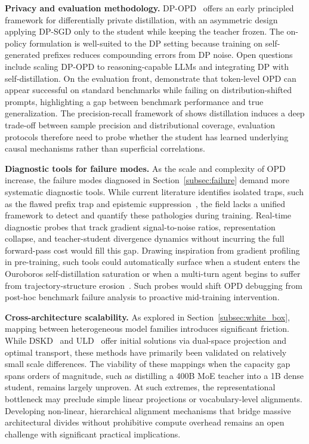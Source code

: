 \documentclass{article} %
\begin{document}
\textbf{Privacy and evaluation methodology.} DP-OPD~\citep{2604.04461} offers an early principled framework for differentially private distillation, with an asymmetric design applying DP-SGD only to the student while keeping the teacher frozen. The on-policy formulation is well-suited to the DP setting because training on self-generated prefixes reduces compounding errors from DP noise. Open questions include scaling DP-OPD to reasoning-capable LLMs and integrating DP with self-distillation. On the evaluation front, \citet{2603.25562} demonstrate that token-level OPD can appear successful on standard benchmarks while failing on distribution-shifted prompts, highlighting a gap between benchmark performance and true generalization. The precision-recall framework of \citet{2505.13111} shows distillation induces a deep trade-off between sample precision and distributional coverage, evaluation protocols therefore need to probe whether the student has learned underlying causal mechanisms rather than superficial correlations.

\textbf{Diagnostic tools for failure modes.} As the scale and complexity of OPD increase, the failure modes diagnosed in Section~\ref{subsec:failure} demand more systematic diagnostic tools. While current literature identifies isolated traps, such as the flawed prefix trap and epistemic suppression~\citep{2603.24472}, the field lacks a unified framework to detect and quantify these pathologies during training. Real-time diagnostic probes that track gradient signal-to-noise ratios, representation collapse, and teacher-student divergence dynamics without incurring the full forward-pass cost would fill this gap. Drawing inspiration from gradient profiling in pre-training, such tools could automatically surface when a student enters the Ouroboros self-distillation saturation or when a multi-turn agent begins to suffer from trajectory-structure erosion~\citep{2605.02943}. Such probes would shift OPD debugging from post-hoc benchmark failure analysis to proactive mid-training intervention.

\textbf{Cross-architecture scalability.} As explored in Section~\ref{subsec:white_box}, mapping between heterogeneous model families introduces significant friction. While DSKD~\citep{2504.11426} and ULD~\citep{2402.12030} offer initial solutions via dual-space projection and optimal transport, these methods have primarily been validated on relatively small scale differences. The viability of these mappings when the capacity gap spans orders of magnitude, such as distilling a 400B MoE teacher into a 1B dense student, remains largely unproven. At such extremes, the representational bottleneck may preclude simple linear projections or vocabulary-level alignments. Developing non-linear, hierarchical alignment mechanisms that bridge massive architectural divides without prohibitive compute overhead remains an open challenge with significant practical implications.
\end{document}
